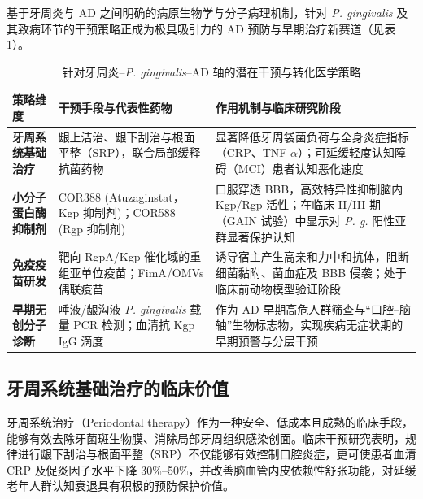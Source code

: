 \documentclass[12pt,a4paper]{ctexart}
\begin{document}
基于牙周炎与 AD 之间明确的病原生物学与分子病理机制，针对 \textit{P. gingivalis} 及其致病环节的干预策略正成为极具吸引力的 AD 预防与早期治疗新赛道（见表\ref{tab:therapy}）。

\begin{table}[htbp]
\centering
\small
\caption{针对牙周炎--\textit{P. gingivalis}--AD 轴的潜在干预与转化医学策略}
\label{tab:therapy}
\begin{tabular}{lp{6.5cm}p{6.5cm}}
\toprule
\textbf{策略维度} & \textbf{干预手段与代表性药物} & \textbf{作用机制与临床研究阶段} \\
\midrule
\textbf{牙周系统基础治疗} & 龈上洁治、龈下刮治与根面平整（SRP），联合局部缓释抗菌药物 & 显著降低牙周袋菌负荷与全身炎症指标（CRP、TNF-$\alpha$）；可延缓轻度认知障碍（MCI）患者认知恶化速度\cite{tangzhiqun2018} \\
\midrule
\textbf{小分子蛋白酶抑制剂} & COR388 (Atuzaginstat，Kgp 抑制剂)；COR588 (Rgp 抑制剂) & 口服穿透 BBB，高效特异性抑制脑内 Kgp/Rgp 活性；在临床 II/III 期（GAIN 试验）中显示对 \textit{P. g.} 阳性亚群显著保护认知 \\
\midrule
\textbf{免疫疫苗研发} & 靶向 RgpA/Kgp 催化域的重组亚单位疫苗；FimA/OMVs 偶联疫苗 & 诱导宿主产生高亲和力中和抗体，阻断细菌黏附、菌血症及 BBB 侵袭；处于临床前动物模型验证阶段 \\
\midrule
\textbf{早期无创分子诊断} & 唾液/龈沟液 \textit{P. gingivalis} 载量 PCR 检测；血清抗 Kgp IgG 滴度 & 作为 AD 早期高危人群筛查与“口腔--脑轴”生物标志物，实现疾病无症状期的早期预警与分层干预 \\
\bottomrule
\end{tabular}
\end{table}

\subsection{牙周系统基础治疗的临床价值}
牙周系统治疗（Periodontal therapy）作为一种安全、低成本且成熟的临床手段，能够有效去除牙菌斑生物膜、消除局部牙周组织感染创面。临床干预研究表明，规律进行龈下刮治与根面平整（SRP）不仅能够有效控制口腔炎症，更可使患者血清 CRP 及促炎因子水平下降 30\%--50\%，并改善脑血管内皮依赖性舒张功能，对延缓老年人群认知衰退具有积极的预防保护价值\cite{tangzhiqun2018, caocaifang2004}。
\end{document}
